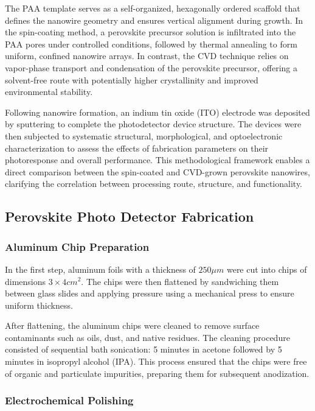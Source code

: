 \documentclass{rapportCS}
\begin{document}
	The PAA template serves as a self-organized, hexagonally ordered scaffold that defines the nanowire geometry and ensures vertical alignment during growth. In the spin-coating method, a perovskite precursor solution is infiltrated into the PAA pores under controlled conditions, followed by thermal annealing to form uniform, confined nanowire arrays. In contrast, the CVD technique relies on vapor-phase transport and condensation of the perovskite precursor, offering a solvent-free route with potentially higher crystallinity and improved environmental stability.
	
	Following nanowire formation, an indium tin oxide (ITO) electrode was deposited by sputtering to complete the photodetector device structure. The devices were then subjected to systematic structural, morphological, and optoelectronic characterization to assess the effects of fabrication parameters on their photoresponse and overall performance. This methodological framework enables a direct comparison between the spin-coated and CVD-grown perovskite nanowires, clarifying the correlation between processing route, structure, and functionality.
	
	
	\subsection{Perovskite Photo Detector Fabrication}
	
	\subsubsection{Aluminum Chip Preparation}
	In the first step, aluminum foils with a thickness of $250 \mu m$ were cut into chips of dimensions $3\times 4 cm^2$. The chips were then flattened by sandwiching them between glass slides and applying pressure using a mechanical press to ensure uniform thickness.
	
	After flattening, the aluminum chips were cleaned to remove surface contaminants such as oils, dust, and native residues. The cleaning procedure consisted of sequential bath sonication: 5 minutes in acetone followed by 5 minutes in isopropyl alcohol (IPA). This process ensured that the chips were free of organic and particulate impurities, preparing them for subsequent anodization. 
	
	\subsubsection{Electrochemical Polishing}
	
\end{document}
